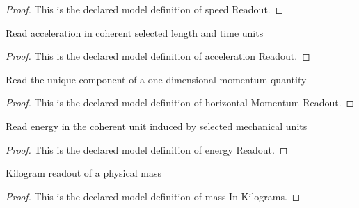 \begin{proof}
  This is the declared model definition of speed Readout.
\end{proof}
\begin{definition}
  \label{def:physics:phyx-mini-0815:phyxminiproblems-problemphyxmini0815-accelerationreadout}
  Read acceleration in coherent selected length and time units
\end{definition}
\begin{proof}
  This is the declared model definition of acceleration Readout.
\end{proof}
\begin{definition}
  \label{def:physics:phyx-mini-0815:phyxminiproblems-problemphyxmini0815-horizontalmomentumreadout}
  Read the unique component of a one-dimensional momentum quantity
\end{definition}
\begin{proof}
  This is the declared model definition of horizontal Momentum Readout.
\end{proof}
\begin{definition}
  \label{def:physics:phyx-mini-0815:phyxminiproblems-problemphyxmini0815-energyreadout}
  Read energy in the coherent unit induced by selected mechanical units
\end{definition}
\begin{proof}
  This is the declared model definition of energy Readout.
\end{proof}
\begin{definition}
  \label{def:physics:phyx-mini-0815:phyxminiproblems-problemphyxmini0815-massinkilograms}
  Kilogram readout of a physical mass
\end{definition}
\begin{proof}
  This is the declared model definition of mass In Kilograms.
\end{proof}
